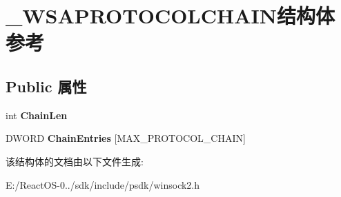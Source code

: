 \hypertarget{struct___w_s_a_p_r_o_t_o_c_o_l_c_h_a_i_n}{}\section{\+\_\+\+W\+S\+A\+P\+R\+O\+T\+O\+C\+O\+L\+C\+H\+A\+I\+N结构体 参考}
\label{struct___w_s_a_p_r_o_t_o_c_o_l_c_h_a_i_n}
\subsection*{Public 属性}
\begin{DoxyCompactItemize}
\item 
\mbox{\label{struct___w_s_a_p_r_o_t_o_c_o_l_c_h_a_i_n_ae7cf435298d3f0a218ebcff70840a53b}} 
int {\bfseries Chain\+Len}
\item 
\mbox{\label{struct___w_s_a_p_r_o_t_o_c_o_l_c_h_a_i_n_a97a145cad5ae497d867e74312c2febdc}} 
D\+W\+O\+RD {\bfseries Chain\+Entries} \mbox{[}M\+A\+X\+\_\+\+P\+R\+O\+T\+O\+C\+O\+L\+\_\+\+C\+H\+A\+IN\mbox{]}
\end{DoxyCompactItemize}


该结构体的文档由以下文件生成\+:\begin{DoxyCompactItemize}
\item 
E\+:/\+React\+O\+S-\/0../sdk/include/psdk/winsock2.\+h\end{DoxyCompactItemize}
